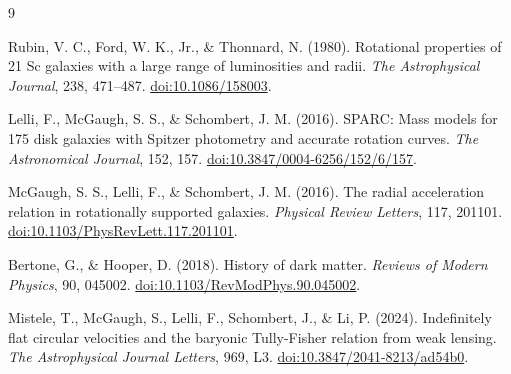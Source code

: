 \documentclass[10pt]{article}
\begin{document}
\begingroup\small
\begin{thebibliography}{9}

Rubin, V. C., Ford, W. K., Jr., \& Thonnard, N. (1980).
Rotational properties of 21 Sc galaxies with a large range of luminosities and radii.
\emph{The Astrophysical Journal}, 238, 471--487.
\href{https://doi.org/10.1086/158003}{doi:10.1086/158003}.

Lelli, F., McGaugh, S. S., \& Schombert, J. M. (2016).
SPARC: Mass models for 175 disk galaxies with Spitzer photometry and accurate rotation curves.
\emph{The Astronomical Journal}, 152, 157.
\href{https://doi.org/10.3847/0004-6256/152/6/157}{doi:10.3847/0004-6256/152/6/157}.

McGaugh, S. S., Lelli, F., \& Schombert, J. M. (2016).
The radial acceleration relation in rotationally supported galaxies.
\emph{Physical Review Letters}, 117, 201101.
\href{https://doi.org/10.1103/PhysRevLett.117.201101}{doi:10.1103/PhysRevLett.117.201101}.

Bertone, G., \& Hooper, D. (2018).
History of dark matter.
\emph{Reviews of Modern Physics}, 90, 045002.
\href{https://doi.org/10.1103/RevModPhys.90.045002}{doi:10.1103/RevModPhys.90.045002}.

Mistele, T., McGaugh, S., Lelli, F., Schombert, J., \& Li, P. (2024).
Indefinitely flat circular velocities and the baryonic Tully-Fisher relation from weak lensing.
\emph{The Astrophysical Journal Letters}, 969, L3.
\href{https://doi.org/10.3847/2041-8213/ad54b0}{doi:10.3847/2041-8213/ad54b0}.

\end{thebibliography}
\endgroup
\end{document}
